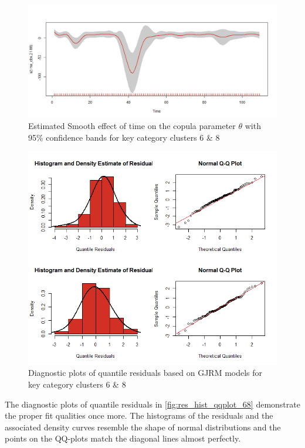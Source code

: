 \begin{figure}[H]
\centering
  \includegraphics[width=0.95\linewidth]{figures/time_effect_on_theta_68.png}
  \caption{Estimated Smooth effect of time on the copula parameter $\theta$ with 95\% confidence bands for key category clusters 6 \& 8}
  \label{fig:time_effect_on_theta_68}
\end{figure}







\begin{figure}[H]
\centering
  \includegraphics[width=0.80\linewidth]{figures/res_hist_qqplot_68.png}
  \caption{Diagnostic plots of quantile residuals based on \ac{GJRM} models for key category clusters 6 \& 8}
  \label{fig:res_hist_qqplot_68}
\end{figure}




The diagnostic plots of quantile residuals in \autoref{fig:res_hist_qqplot_68} demonstrate the proper fit qualities once more. The histograms of the residuals and the associated density curves resemble the shape of normal distributions and the points on the QQ-plots match the diagonal lines almost perfectly. 
\\



